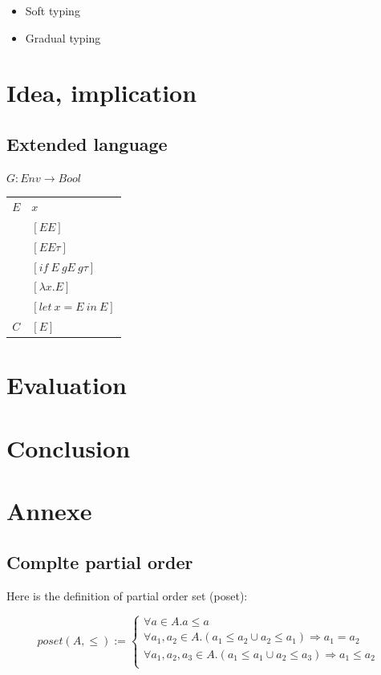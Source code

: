 \documentclass[a4paper]{report}
\begin{document}
\begin{itemize}
\item Soft typing
\item Gradual typing ~\cite{a}
\end{itemize}

\chapter{Idea, implication}

\section{Extended language}

$G : Env \to Bool$

\begin{tabular}{|r|l|}
\hline
$E$ & $x$\\
& $[E E]$\\
& $[E E \tau]$\\
& $[if\ E\ g E\ g \tau]$\\
& $[\lambda x.E]$\\
& $[let\ x=E\ in\ E]$\\
\hline
$C$ & $[E]$\\
\hline
\end{tabular}

\chapter{Evaluation}
\chapter{Conclusion}

\chapter{Annexe}

\section{Complte partial order}

Here is the definition of partial order set (poset):

$$poset (A,\leq) := \left\{\begin{array}{l}
	\forall a\in A . a \leq a\\
	\forall a_1, a_2 \in A . (a_1 \leq a_2 \cup a_2\leq a_1) \Rightarrow a_1 = a_2\\
	\forall a_1, a_2, a_3 \in A . (a_1 \leq a_1 \cup a_2\leq a_3) \Rightarrow a_1 \leq a_2\\
	\end{array}\right.$$
\end{document}

